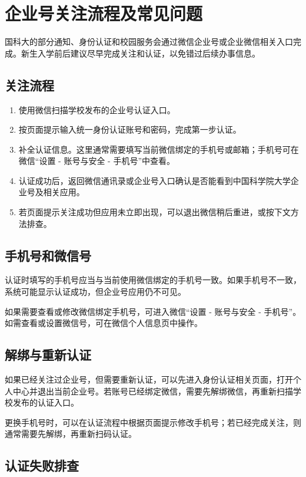 \chapter{企业号关注流程及常见问题}

国科大的部分通知、身份认证和校园服务会通过微信企业号或企业微信相关入口完成。新生入学前后建议尽早完成关注和认证，以免错过后续办事信息。

\section{关注流程}

\begin{enumerate}
  \item 使用微信扫描学校发布的企业号认证入口。
  \item 按页面提示输入统一身份认证账号和密码，完成第一步认证。
  \item 补全认证信息。这里通常需要填写当前微信绑定的手机号或邮箱；手机号可在微信“设置 - 账号与安全 - 手机号”中查看。
  \item 认证成功后，返回微信通讯录或企业号入口确认是否能看到中国科学院大学企业号及相关应用。
  \item 若页面提示关注成功但应用未立即出现，可以退出微信稍后重进，或按下文方法排查。
\end{enumerate}

\section{手机号和微信号}

认证时填写的手机号应当与当前使用微信绑定的手机号一致。如果手机号不一致，系统可能显示认证成功，但企业号应用仍不可见。

如果需要查看或修改微信绑定手机号，可进入微信“设置 - 账号与安全 - 手机号”。如需查看或设置微信号，可在微信个人信息页中操作。

\section{解绑与重新认证}

如果已经关注过企业号，但需要重新认证，可以先进入身份认证相关页面，打开个人中心并退出当前企业号。若账号已经绑定微信，需要先解绑微信，再重新扫描学校发布的认证入口。

更换手机号时，可以在认证流程中根据页面提示修改手机号；若已经完成关注，则通常需要先解绑，再重新扫码认证。

\section{认证失败排查}

